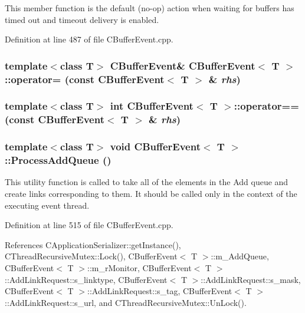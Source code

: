 This member function is the default (no-op) action when waiting for buffers has timed out and timeout delivery is enabled. 

Definition at line 487 of file CBuffer\-Event.cpp.
\subsubsection{\setlength{\rightskip}{0pt plus 5cm}template$<$class T$>$ CBuffer\-Event\& CBuffer\-Event$<$ T $>$::operator= (const CBuffer\-Event$<$ T $>$ \& {\em rhs})\hspace{0.3cm}{\tt  [private]}}\label{classCBufferEvent_c1}


\subsubsection{\setlength{\rightskip}{0pt plus 5cm}template$<$class T$>$ int CBuffer\-Event$<$ T $>$::operator== (const CBuffer\-Event$<$ T $>$ \& {\em rhs})\hspace{0.3cm}{\tt  [private]}}\label{classCBufferEvent_c2}


\subsubsection{\setlength{\rightskip}{0pt plus 5cm}template$<$class T$>$ void CBuffer\-Event$<$ T $>$::Process\-Add\-Queue ()\hspace{0.3cm}{\tt  [protected]}}\label{classCBufferEvent_b1}


This utility function is called to take all of the elements in the  Add queue and create links corresponding to them. It should be called only in the context of the executing event thread. 

Definition at line 515 of file CBuffer\-Event.cpp.

References CApplication\-Serializer::get\-Instance(), CThread\-Recursive\-Mutex::Lock(), CBuffer\-Event$<$ T $>$::m\_\-Add\-Queue, CBuffer\-Event$<$ T $>$::m\_\-r\-Monitor, CBuffer\-Event$<$ T $>$::Add\-Link\-Request::s\_\-linktype, CBuffer\-Event$<$ T $>$::Add\-Link\-Request::s\_\-mask, CBuffer\-Event$<$ T $>$::Add\-Link\-Request::s\_\-tag, CBuffer\-Event$<$ T $>$::Add\-Link\-Request::s\_\-url, and CThread\-Recursive\-Mutex::Un\-Lock().

